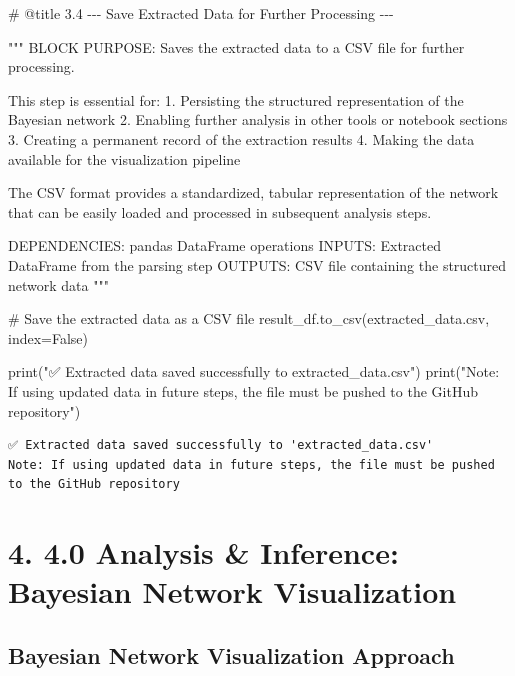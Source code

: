 \documentclass[
  11pt,
  letterpaper,
]{book}
\newenvironment{Shaded}{\begin{snugshade}}{\end{snugshade}}
\newcommand{\BuiltInTok}[1]{\textcolor[rgb]{0.00,0.23,0.31}{#1}}
\newcommand{\CommentTok}[1]{\textcolor[rgb]{0.37,0.37,0.37}{#1}}
\newcommand{\NormalTok}[1]{\textcolor[rgb]{0.00,0.23,0.31}{#1}}
\newcommand{\OperatorTok}[1]{\textcolor[rgb]{0.37,0.37,0.37}{#1}}
\newcommand{\StringTok}[1]{\textcolor[rgb]{0.13,0.47,0.30}{#1}}
\newcommand{\VariableTok}[1]{\textcolor[rgb]{0.07,0.07,0.07}{#1}}
\begin{document}
\begin{Shaded}
\begin{Highlighting}[]
\CommentTok{\# @title 3.4 {-}{-}{-} Save Extracted Data for Further Processing {-}{-}{-}}

\CommentTok{"""}
\CommentTok{BLOCK PURPOSE: Saves the extracted data to a CSV file for further processing.}

\CommentTok{This step is essential for:}
\CommentTok{1. Persisting the structured representation of the Bayesian network}
\CommentTok{2. Enabling further analysis in other tools or notebook sections}
\CommentTok{3. Creating a permanent record of the extraction results}
\CommentTok{4. Making the data available for the visualization pipeline}

\CommentTok{The CSV format provides a standardized, tabular representation of the network}
\CommentTok{that can be easily loaded and processed in subsequent analysis steps.}

\CommentTok{DEPENDENCIES: pandas DataFrame operations}
\CommentTok{INPUTS: Extracted DataFrame from the parsing step}
\CommentTok{OUTPUTS: CSV file containing the structured network data}
\CommentTok{"""}

\CommentTok{\# Save the extracted data as a CSV file}
\NormalTok{result\_df.to\_csv(}\StringTok{\textquotesingle{}extracted\_data.csv\textquotesingle{}}\NormalTok{, index}\OperatorTok{=}\VariableTok{False}\NormalTok{)}

\BuiltInTok{print}\NormalTok{(}\StringTok{"✅ Extracted data saved successfully to \textquotesingle{}extracted\_data.csv\textquotesingle{}"}\NormalTok{)}
\BuiltInTok{print}\NormalTok{(}\StringTok{"Note: If using updated data in future steps, the file must be pushed to the GitHub repository"}\NormalTok{)}
\end{Highlighting}
\end{Shaded}

\begin{verbatim}
✅ Extracted data saved successfully to 'extracted_data.csv'
Note: If using updated data in future steps, the file must be pushed to the GitHub repository
\end{verbatim}

\chapter{4. 4.0 Analysis \& Inference: Bayesian Network
Visualization}\label{analysis-inference-bayesian-network-visualization}

\section{Bayesian Network Visualization
Approach}\label{bayesian-network-visualization-approach}
\end{document}
